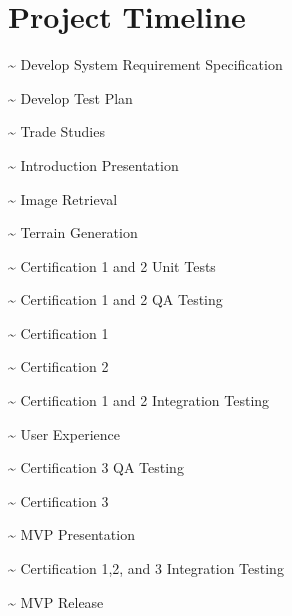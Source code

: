 \documentclass[letterpaper,10pt,english,openany,oneside]{sphinxmanual}
\let\sphinxpxdimen\pdfpxdimen\else\newdimen\sphinxpxdimen
\begin{document}
\chapter{Project Timeline}
\label{\detokenize{test_plan/project_timeline:project-timeline}}\label{\detokenize{test_plan/project_timeline::doc}}
\noindent\sphinxincludegraphics[width=630\sphinxpxdimen]{{project_plan}.png}

\pagebreak


\textasciitilde{}  Develop System Requirement Specification

\textasciitilde{}  Develop Test Plan

\textasciitilde{}  Trade Studies

\textasciitilde{}  Introduction Presentation

\textasciitilde{}  Image Retrieval

\textasciitilde{}  Terrain Generation

\textasciitilde{}  Certification 1 and 2 Unit Tests

\textasciitilde{}  Certification 1 and 2 QA Testing

\textasciitilde{}  Certification 1

\textasciitilde{}  Certification 2

\textasciitilde{}  Certification 1 and 2 Integration Testing

\textasciitilde{}  User Experience

\textasciitilde{}  Certification 3 QA Testing

\textasciitilde{}  Certification 3

\textasciitilde{}  MVP Presentation

\textasciitilde{}  Certification 1,2, and 3 Integration Testing

\textasciitilde{}  MVP Release
\end{document}
